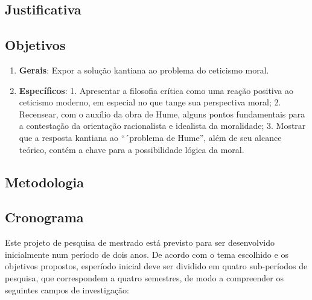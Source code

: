 \documentclass[
  brazilian,
  letterpaper,
  DIV=11,
  numbers=noendperiod]{scrartcl}
\providecommand{\tightlist}{%
  \setlength{\itemsep}{0pt}\setlength{\parskip}{0pt}}
\begin{document}
\subsection{Justificativa}\label{justificativa}

\subsection{Objetivos}\label{objetivos}

\begin{enumerate}
\def\labelenumi{\arabic{enumi}.}
\tightlist
\item
  \textbf{Gerais}: Expor a solução kantiana ao problema do ceticismo
  moral.
\item
  \textbf{Específicos}: 1. Apresentar a filosofia crítica como uma
  reação positiva ao ceticismo moderno, em especial no que tange sua
  perspectiva moral; 2. Recensear, com o auxílio da obra de Hume, alguns
  pontos fundamentais para a contestação da orientação racionalista e
  idealista da moralidade; 3. Mostrar que a resposta kantiana ao
  ``´problema de Hume'', além de seu alcance teórico, contém a chave
  para a possibilidade lógica da moral.
\end{enumerate}

\subsection{Metodologia}\label{metodologia}

\subsection{Cronograma}\label{cronograma}

Este projeto de pesquisa de mestrado está previsto para ser desenvolvido
inicialmente num período de dois anos. De acordo com o tema escolhido e
os objetivos propostos, esperíodo inicial deve ser dividido em quatro
sub-períodos de pesquisa, que correspondem a quatro semestres, de modo a
compreender os seguintes campos de investigação:
\end{document}
